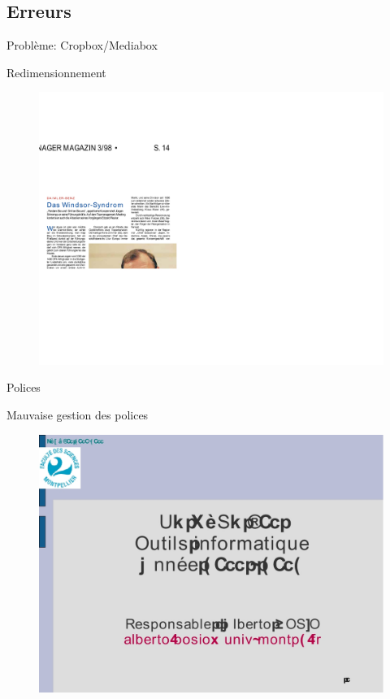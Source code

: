 \subsection{Erreurs}
\begin{frame}{Problème: Cropbox/Mediabox}
	\begin{block}{Redimensionnement}
		\begin{figure}[h]
        		\begin{center}
         		\includegraphics[scale=0.08]{images/fail1.jpg} 
        		\end{center}
    		\end{figure}
	\end{block}
\end{frame}

\begin{frame}{Polices}
	\begin{block}{Mauvaise gestion des polices}
		\begin{figure}[h]
        		\begin{center}
         		\includegraphics[scale=0.17]{images/fail2.jpg} 
        		\end{center}
    		\end{figure}
	\end{block}
\end{frame}
